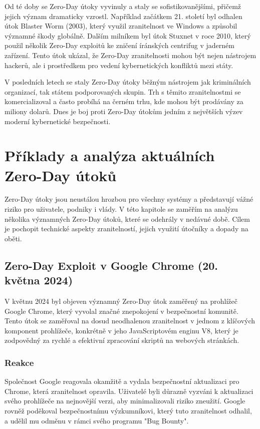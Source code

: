 \documentclass[11pt, conference, a4paper]{IEEEtran}
\begin{document}
Od té doby se Zero-Day útoky vyvinuly a staly se sofistikovanějšími, přičemž jejich význam dramaticky vzrostl. Například začátkem 21. století byl odhalen útok Blaster Worm (2003), který využil zranitelnost ve Windows a způsobil významné škody globálně. Dalším milníkem byl útok Stuxnet v roce 2010, který použil několik Zero-Day exploitů ke zničení íránských centrifug v jaderném zařízení. Tento útok ukázal, že Zero-Day zranitelnosti mohou být nejen nástrojem hackerů, ale i prostředkem pro vedení kybernetických konfliktů mezi státy.

V posledních letech se staly Zero-Day útoky běžným nástrojem jak kriminálních organizací, tak státem podporovaných skupin. Trh s těmito zranitelnostmi se komercializoval a často probíhá na černém trhu, kde mohou být prodávány za miliony dolarů. Dnes je boj proti Zero-Day útokům jedním z největších výzev moderní kybernetické bezpečnosti.



\section{Příklady a analýza aktuálních Zero-Day útoků}
Zero-Day útoky jsou neustálou hrozbou pro všechny systémy a představují vážné riziko pro uživatele, podniky i vlády. V této kapitole se zaměřím na analýzu několika významných Zero-Day útoků, které se odehrály v nedávné době. Cílem je pochopit technické aspekty zranitelností, jejich využití útočníky a dopady na oběti.

\subsection{Zero-Day Exploit v Google Chrome (20. května 2024) \cite{google}}
V květnu 2024 byl objeven významný Zero-Day útok zaměřený na prohlížeč Google Chrome, který vyvolal značné znepokojení v bezpečnostní komunitě. Tento útok se zaměřoval na dosud neodhalenou zranitelnost v jednom z klíčových komponent prohlížeče, konkrétně v jeho JavaScriptovém enginu V8, který je zodpovědný za rychlé a efektivní zpracování skriptů na webových stránkách.
\subsubsection{Reakce}
Společnost Google reagovala okamžitě a vydala bezpečnostní aktualizaci pro Chrome, která zranitelnost opravila. Uživatelé byli důrazně vyzváni k aktualizaci svého prohlížeče na nejnovější verzi, aby minimalizovali riziko zneužití. Google rovněž poděkoval bezpečnostnímu výzkumníkovi, který tuto zranitelnost odhalil, a udělil mu odměnu v rámci svého programu "Bug Bounty".
\end{document}
